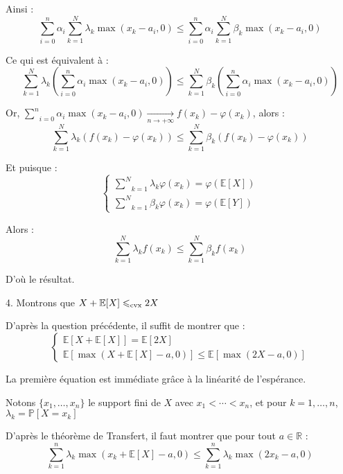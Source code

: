Ainsi :
\[ \underset{i = 0}{\overset{n}{\sum}} \alpha_i \underset{k =
   1}{\overset{N}{\sum}} \lambda_k \max (x_k - a_i, 0) \leqslant \underset{i =
   0}{\overset{n}{\sum}} \alpha_i \underset{k = 1}{\overset{N}{\sum}} \beta_k
   \max (x_k - a_i, 0) \]


Ce qui est {\'e}quivalent {\`a} :
\[ \underset{k = 1}{\overset{N}{\sum}} \lambda_k \left( \underset{i =
   0}{\overset{n}{\sum}} \alpha_i \max (x_k - a_i, 0) \right) \leqslant
   \underset{k = 1}{\overset{N}{\sum}} \beta_k \left( \underset{i =
   0}{\overset{n}{\sum}} \alpha_i \max (x_k - a_i, 0) \right) \]


Or, $\underset{i = 0}{\overset{n}{\sum}} \alpha_i \max (x_k - a_i, 0)
\underset{n \rightarrow + \infty}{\rightarrow} f (x_k) - \varphi (x_k)$, alors
:
\[ \underset{k = 1}{\overset{N}{\sum}} \lambda_k (f (x_k) - \varphi (x_k))
   \leqslant \underset{k = 1}{\overset{N}{\sum}} \beta_k (f (x_k) - \varphi
   (x_k)) \]


Et puisque :
\[ \left\{\begin{array}{l}
     \underset{k = 1}{\overset{N}{\sum}} \lambda_k \varphi (x_k) = \varphi
     (\mathbb{E} [X])\\
     \underset{k = 1}{\overset{N}{\sum}} \beta_k \varphi (x_k) = \varphi
     (\mathbb{E} [Y])
   \end{array}\right. \]


Alors :
\[ \underset{k = 1}{\overset{N}{\sum}} \lambda_k f (x_k) \leqslant \underset{k
   = 1}{\overset{N}{\sum}} \beta_k f (x_k) \]


D'o{\`u} le r{\'e}sultat.

4. Montrons que $X +\mathbb{E} [X] \leqslant_{\operatorname{cvx}} 2 X$

D'apr{\`e}s la question pr{\'e}c{\'e}dente, il suffit de montrer que :
\[ \left\{\begin{array}{l}
     \mathbb{E} [X +\mathbb{E} [X]] =\mathbb{E} [2 X]\\
     \mathbb{E} [\max (X +\mathbb{E} [X] - a, 0)] \leqslant \mathbb{E} [\max
     (2 X - a, 0)]
   \end{array}\right. \]


La premi{\`e}re {\'e}quation est imm{\'e}diate gr{\^a}ce {\`a} la
lin{\'e}arit{\'e} de l'esp{\'e}rance.

Notons $\{ x_1, \ldots, x_n \}$ le support fini de $X$ avec $x_1 < \cdots <
x_n$, et pour $k = 1, \ldots, n$, $\lambda_k =\mathbb{P} [X = x_k]$

D'apr{\`e}s le th{\'e}or{\`e}me de Transfert, il faut montrer que pour tout $a
\in \mathbb{R}$ :
\[ \overset{n}{\underset{k = 1}{\sum}} \lambda_k \max (x_k +\mathbb{E} [X] -
   a, 0) \leqslant \overset{n}{\underset{k = 1}{\sum}} \lambda_k \max (2 x_k -
   a, 0) \]



